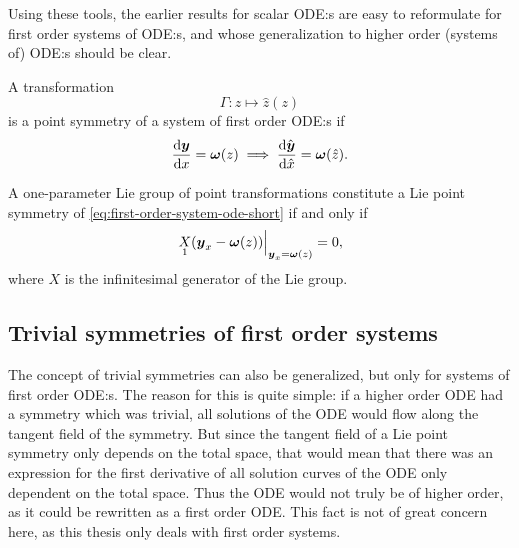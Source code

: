 Using these tools, the earlier results for scalar ODE:s are easy to reformulate for first order systems of ODE:s, and whose generalization to higher order (systems of) ODE:s should be clear.
\begin{defn} \label{defn:general-symmetry}
  A transformation 
  \begin{equation*}
    \Gamma: z \mapsto \hat{z}(z)
  \end{equation*}
  is a point symmetry of a system of first order ODE:s  if
  \begin{equation*}
    \diff{\vect{y}}{x} = \vect{\omega}(z)
    \implies
    \diff{\hat{\vect{y}}}{\hat{x}} = \vect{\omega}(\hat{z}).
  \end{equation*}
\end{defn}
\begin{thm} \label{thm:linearized-general-symmetry}
  A one-parameter Lie group of point transformations constitute a Lie point symmetry of \cref{eq:first-order-system-ode-short} if and only if
  \begin{equation*} \label{eq:linearized-general-symmetry}
    \eval{\prolong{X}{1}\left(\vect{y}_x - \vect{\omega}(z)\right)}_{\vect{y}_x = \vect{\omega}(z)} = 0,
  \end{equation*}
  where \(X\) is the infinitesimal generator of the Lie group.
\end{thm}

\subsection{Trivial symmetries of first order systems}

The concept of trivial symmetries can also be generalized, but only for systems of first order ODE:s.
The reason for this is quite simple: if a higher order ODE had a symmetry which was trivial, all solutions of the ODE would flow along the tangent field of the symmetry.
But since the tangent field of a Lie point symmetry only depends on the total space, that would mean that there was an expression for the first derivative of all solution curves of the ODE only dependent on the total space.
Thus the ODE would not truly be of higher order, as it could be rewritten as a first order ODE.
This fact is not of great concern here, as this thesis only deals with first order systems.

